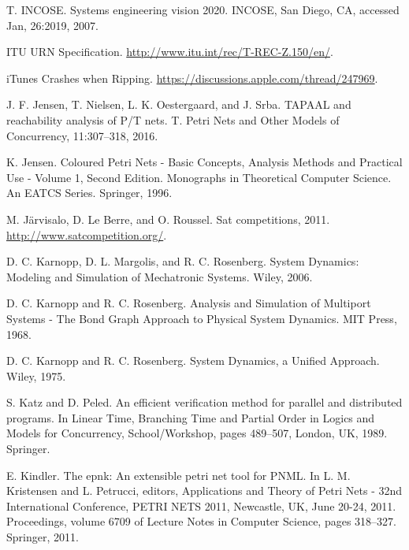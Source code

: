 \begin{description}[style=nextline,leftmargin=12mm,labelwidth=10mm,font=\normalfont]
\item[{[154]}] T. INCOSE. Systems engineering vision 2020. INCOSE, San Diego, CA, accessed Jan, 26:2019, 2007.

\item[{[155]}] ITU URN Specification. \url{http://www.itu.int/rec/T-REC-Z.150/en/}.

\item[{[156]}] iTunes Crashes when Ripping. \url{https://discussions.apple.com/thread/247969}.

\item[{[157]}] J. F. Jensen, T. Nielsen, L. K. Oestergaard, and J. Srba. TAPAAL and reachability analysis of P/T nets. T. Petri Nets and Other Models of Concurrency, 11:307–318, 2016.

\item[{[158]}] K. Jensen. Coloured Petri Nets - Basic Concepts, Analysis Methods and Practical Use - Volume 1, Second Edition. Monographs in Theoretical Computer Science. An EATCS Series. Springer, 1996.

\item[{[159]}] M. Järvisalo, D. Le Berre, and O. Roussel. Sat competitions, 2011. \url{http://www.satcompetition.org/}.

\item[{[160]}] D. C. Karnopp, D. L. Margolis, and R. C. Rosenberg. System Dynamics: Modeling and Simulation of Mechatronic Systems. Wiley, 2006.

\item[{[161]}] D. C. Karnopp and R. C. Rosenberg. Analysis and Simulation of Multiport Systems - The Bond Graph Approach to Physical System Dynamics. MIT Press, 1968.

\item[{[162]}] D. C. Karnopp and R. C. Rosenberg. System Dynamics, a Unified Approach. Wiley, 1975.

\item[{[163]}] S. Katz and D. Peled. An efficient verification method for parallel and distributed programs. In Linear Time, Branching Time and Partial Order in Logics and Models for Concurrency, School/Workshop, pages 489–507, London, UK, 1989. Springer.

\item[{[164]}] E. Kindler. The epnk: An extensible petri net tool for PNML. In L. M. Kristensen and L. Petrucci, editors, Applications and Theory of Petri Nets - 32nd International Conference, PETRI NETS 2011, Newcastle, UK, June 20-24, 2011. Proceedings, volume 6709 of Lecture Notes in Computer Science, pages 318–327. Springer, 2011.


\end{description}
